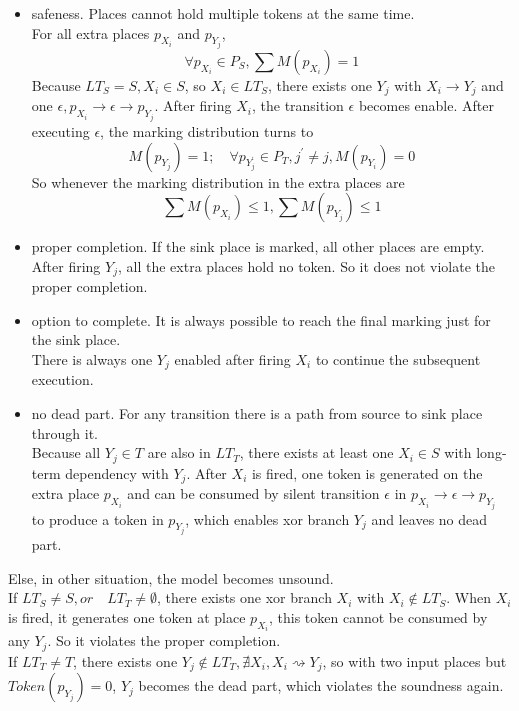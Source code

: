 \begin{itemize}
	\item safeness. Places cannot hold multiple tokens at the same time.\\
	For all extra places $p_{X_i}$ and $p_{Y_j}$, 
	\[\forall p_{X_i} \in P_S, \sum M(p_{X_i})=1\]
	Because $ LT_S = S, X_i \in S$, so $X_i \in LT_S$, there exists one $Y_j$ with $X_i \rightarrow Y_j$ and one $\epsilon, p_{X_i} \rightarrow \epsilon
	\rightarrow p_{Y_{j}} $.  After firing $X_i$, the transition $\epsilon$ becomes enable. After executing $\epsilon$, the marking distribution turns to 
	\[ M(p_{Y_j}) = 1;\quad 
	\forall p_{Y_j^\prime} \in P_T, j^\prime \neq j,  M(p_{Y_i})=0 \]
	So whenever the marking distribution in the extra places are
	\[\sum M(p_{X_i}) \leq 1,  \sum M(p_{Y_j}) \leq 1 \] 
	\item proper completion. If the sink place is marked, all other places are empty. \\
	After firing $Y_j$, all the extra places hold no token. So it does not violate the proper completion.
	\item option to complete.  It is always possible to reach the final marking just for the sink place. \\
	There is always one $Y_j$ enabled after firing $X_i$ to continue the subsequent execution.
	\item no dead part. For any transition there is a path from source to sink place through it. \\
	Because all $Y_j \in T$ are also in $LT_T$, there exists at least one $X_i\in S$ with long-term dependency with $Y_j$. After $X_i$ is fired, one token is generated on the extra place $p_{X_i}$ and can be consumed by silent transition $\epsilon$ in  $p_{X_i} \rightarrow \epsilon \rightarrow p_{Y_{j}}$ to produce a token in $p_{Y_j}$, which enables xor branch $Y_j$ and leaves no dead part.
\end{itemize}
Else, in other situation, the model becomes unsound. \\
\indent If $LT_S \neq S,or\quad LT_T \neq \emptyset$, there exists one xor branch $X_i$ with $X_i \notin LT_S$. When $X_i$ is fired, it generates one token at place $p_{X_i}$, this token cannot be consumed by any $Y_j$. So it violates the proper completion. \\  
\indent If $LT_T \neq T$, there exists one $Y_j \notin LT_T, \nexists X_i, X_i \rightsquigarrow Y_j$, so with two input places but $Token(p_{Y_j})=0$,  $Y_j$ becomes the dead part, which violates the soundness again. \\

